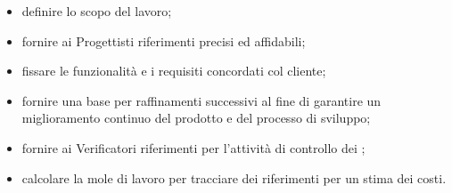                     \begin{itemize}
                        \item definire lo scopo del lavoro;
                        \item fornire ai Progettisti riferimenti precisi ed affidabili;
                        \item fissare le funzionalità e i requisiti concordati col cliente;
                        \item fornire una base per raffinamenti successivi al fine di garantire un miglioramento continuo del prodotto e del processo di sviluppo;
                        \item fornire ai Verificatori riferimenti per l'attività di controllo dei ;
                        \item calcolare la mole di lavoro per tracciare dei riferimenti per un stima dei costi.
                    \end{itemize}
